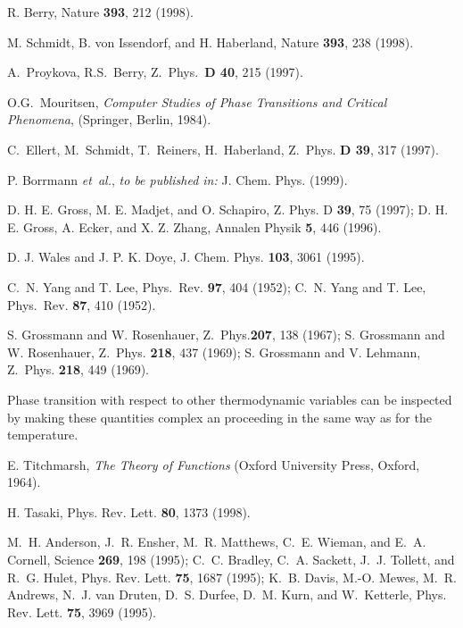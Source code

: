 \begin{thebibliography}{27}

R. Berry, Nature {\bf 393},  212  (1998).

M. Schmidt, B. von Issendorf, and H. Haberland, Nature {\bf 393},  238  (1998).

 A.~Proykova, R.S.~Berry,
        Z.\ Phys.\ {\bf D 40}, 215 (1997). 

 O.G.~Mouritsen, {\sl Computer Studies of Phase
    Transitions and Critical Phenomena}, (Springer, Berlin, 1984).

 C.~Ellert, M.~Schmidt, T.~Reiners, H.~Haberland,
        Z.\ Phys. {\bf D 39}, 317 (1997). 

P. Borrmann {\it et~al.}, {\sl to be published in:} J. Chem. Phys.  (1999).

D. H. E. Gross, M. E. Madjet, and O. Schapiro, Z. Phys. D {\bf 39}, 75 (1997);
D. H. E. Gross, A. Ecker, and X. Z. Zhang, Annalen Physik {\bf 5}, 446 (1996).

D. J. Wales and J. P. K. Doye, J. Chem. Phys. {\bf 103}, 3061 (1995).

C.~N. Yang and T. Lee, Phys.\ Rev. {\bf 97},  404  (1952);
C.~N. Yang and T. Lee, Phys.\ Rev. {\bf 87},  410  (1952).

S. Grossmann and W. Rosenhauer, Z.\ Phys.{\bf 207}, 138 (1967);
S. Grossmann and W. Rosenhauer, Z.\ Phys. {\bf 218}, 437 (1969);
S. Grossmann and V. Lehmann, Z.\ Phys. {\bf 218}, 449 (1969).

Phase transition with respect to other thermodynamic variables can 
be inspected by making these quantities complex an proceeding in the 
same way as for the temperature.

E. Titchmarsh, {\em The Theory of Functions} (Oxford University Press, Oxford,
  1964).

H. Tasaki, Phys. Rev. Lett. {\bf 80},  1373  (1998).

M.~H. Anderson, J.~R. Ensher, M.~R. Matthews, C.~E. Wieman, and E.~A. Cornell,
Science {\bf 269}, 198 (1995);
C.~C. Bradley, C.~A. Sackett, J.~J. Tollett, and R.~G. Hulet,
Phys. Rev. Lett. {\bf 75}, 1687 (1995);
K.~B. Davis, M.-O. Mewes, M.~R. Andrews, N.~J. van Druten, D.~S. Durfee, D.~M.
Kurn, and W.~Ketterle, Phys. Rev. Lett. {\bf 75}, 3969 (1995).


\end{thebibliography}
